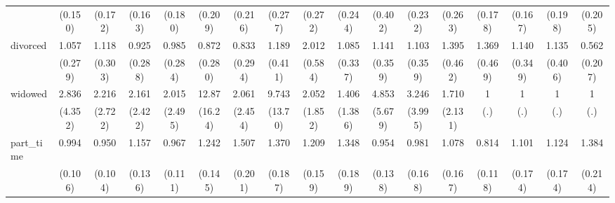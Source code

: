 {\begin{tabular}{l*{16}{c}}
                    &     (0.150)         &     (0.172)         &     (0.163)         &     (0.180)         &     (0.209)         &     (0.216)         &     (0.277)         &     (0.272)         &     (0.244)         &     (0.402)         &     (0.232)         &     (0.263)         &     (0.178)         &     (0.167)         &     (0.198)         &     (0.205)         \\
[1em]
divorced            &       1.057         &       1.118         &       0.925         &       0.985         &       0.872         &       0.833         &       1.189         &       2.012\sym{*}  &       1.085         &       1.141         &       1.103         &       1.395         &       1.369         &       1.140         &       1.135         &       0.562         \\
                    &     (0.279)         &     (0.303)         &     (0.288)         &     (0.284)         &     (0.280)         &     (0.294)         &     (0.411)         &     (0.584)         &     (0.337)         &     (0.359)         &     (0.359)         &     (0.462)         &     (0.469)         &     (0.349)         &     (0.406)         &     (0.207)         \\
[1em]
widowed             &       2.836         &       2.216         &       2.161         &       2.015         &       12.87\sym{*}  &       2.061         &       9.743         &       2.052         &       1.406         &       4.853         &       3.246         &       1.710         &           1         &           1         &           1         &           1         \\
                    &     (4.352)         &     (2.722)         &     (2.422)         &     (2.495)         &     (16.24)         &     (2.454)         &     (13.70)         &     (1.852)         &     (1.386)         &     (5.679)         &     (3.995)         &     (2.131)         &         (.)         &         (.)         &         (.)         &         (.)         \\
[1em]
part\_time           &       0.994         &       0.950         &       1.157         &       0.967         &       1.242         &       1.507\sym{**} &       1.370\sym{*}  &       1.209         &       1.348\sym{*}  &       0.954         &       0.981         &       1.078         &       0.814         &       1.101         &       1.124         &       1.384\sym{*}  \\
                    &     (0.106)         &     (0.104)         &     (0.136)         &     (0.111)         &     (0.145)         &     (0.201)         &     (0.187)         &     (0.159)         &     (0.189)         &     (0.138)         &     (0.168)         &     (0.167)         &     (0.118)         &     (0.174)         &     (0.174)         &     (0.214)         \\

\end{tabular}}
